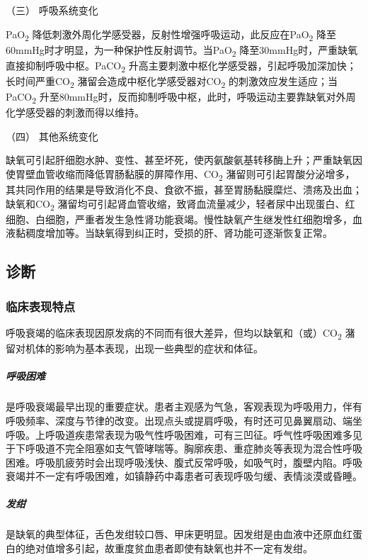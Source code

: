 \hypertarget{text00076.htmlux5cux23CHP3-4-1-4-3}{}
（三） 呼吸系统变化

PaO\textsubscript{2}
降低刺激外周化学感受器，反射性增强呼吸运动，此反应在PaO\textsubscript{2}
降至60mmHg时才明显，为一种保护性反射调节。当PaO\textsubscript{2}
降至30mmHg时，严重缺氧直接抑制呼吸中枢。PaCO\textsubscript{2}
升高主要刺激中枢化学感受器，引起呼吸加深加快；长时间严重CO\textsubscript{2}
潴留会造成中枢化学感受器对CO\textsubscript{2}
的刺激效应发生适应；当PaCO\textsubscript{2}
升至80mmHg时，反而抑制呼吸中枢，此时，呼吸运动主要靠缺氧对外周化学感受器的刺激而得以维持。

\hypertarget{text00076.htmlux5cux23CHP3-4-1-4-4}{}
（四） 其他系统变化

缺氧可引起肝细胞水肿、变性、甚至坏死，使丙氨酸氨基转移酶上升；严重缺氧因使胃壁血管收缩而降低胃肠黏膜的屏障作用、CO\textsubscript{2}
潴留则可引起胃酸分泌增多，其共同作用的结果是导致消化不良、食欲不振，甚至胃肠黏膜糜烂、溃疡及出血；缺氧和CO\textsubscript{2}
潴留均可引起肾血管收缩，致肾血流量减少，轻者尿中出现蛋白、红细胞、白细胞，严重者发生急性肾功能衰竭。慢性缺氧产生继发性红细胞增多，血液黏稠度增加等。当缺氧得到纠正时，受损的肝、肾功能可逐渐恢复正常。

\subsection{诊断}

\subsubsection{临床表现特点}

呼吸衰竭的临床表现因原发病的不同而有很大差异，但均以缺氧和（或）CO\textsubscript{2}
潴留对机体的影响为基本表现，出现一些典型的症状和体征。

\subparagraph{呼吸困难}

是呼吸衰竭最早出现的重要症状。患者主观感为气急，客观表现为呼吸用力，伴有呼吸频率、深度与节律的改变。出现点头或提肩呼吸，有时还可见鼻翼扇动、端坐呼吸。上呼吸道疾患常表现为吸气性呼吸困难，可有三凹征。呼气性呼吸困难多见于下呼吸道不完全阻塞如支气管哮喘等。胸廓疾患、重症肺炎等表现为混合性呼吸困难。呼吸肌疲劳时会出现呼吸浅快、腹式反常呼吸，如吸气时，腹壁内陷。呼吸衰竭并不一定有呼吸困难，如镇静药中毒患者可表现呼吸匀缓、表情淡漠或昏睡。

\subparagraph{发绀}

是缺氧的典型体征，舌色发绀较口唇、甲床更明显。因发绀是由血液中还原血红蛋白的绝对值增多引起，故重度贫血患者即使有缺氧也并不一定有发绀。

